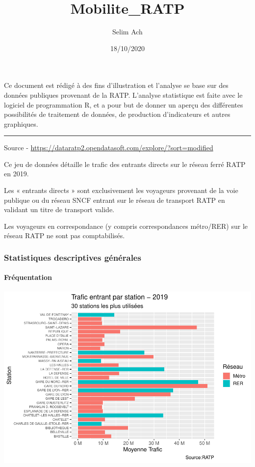 \documentclass[]{article}
\title{Mobilite\_RATP}
\author{Selim Ach}
\date{18/10/2020}
\let\oldparagraph\paragraph
\renewcommand{\paragraph}[1]{\oldparagraph{#1}\mbox{}}
\begin{document}
\maketitle

Ce document est rédigé à des fins d'illustration et l'analyse se base
sur des données publiques provenant de la RATP. L'analyse statistique
est faite avec le logiciel de programmation R, et a pour but de donner
un aperçu des différentes possibilités de traitement de données, de
production d'indicateurs et autres graphiques.

\begin{center}\rule{0.5\linewidth}{0.5pt}\end{center}

Source - \url{https://dataratp2.opendatasoft.com/explore/?sort=modified}

Ce jeu de données détaille le trafic des entrants directs sur le réseau
ferré RATP en 2019.

Les « entrants directs » sont exclusivement les voyageurs provenant de
la voie publique ou du réseau SNCF entrant sur le réseau de transport
RATP en validant un titre de transport valide.

Les voyageurs en correspondance (y compris correspondances métro/RER)
sur le réseau RATP ne sont pas comptabilisés.

\hypertarget{statistiques-descriptives-guxe9nuxe9rales}{%
\subsubsection{Statistiques descriptives
générales}\label{statistiques-descriptives-guxe9nuxe9rales}}

\hypertarget{fruxe9quentation}{%
\paragraph{Fréquentation}\label{fruxe9quentation}}

\includegraphics{Mobilite_RATP_files/figure-latex/unnamed-chunk-2-1.pdf}
\end{document}
